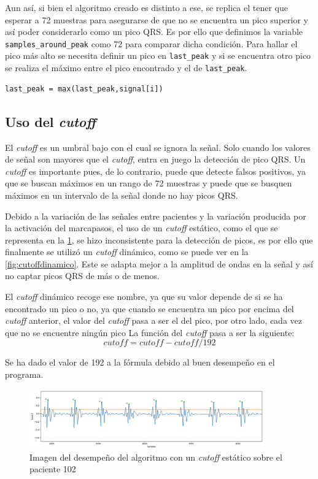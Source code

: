 Aun así, si bien el algoritmo creado es distinto a ese, se replica el tener que esperar a 72 muestras para asegurarse de que no se encuentra un pico superior y así poder considerarlo como un pico QRS. Es por ello que definimos la variable \texttt{samples\_around\_peak} como 72 para comparar dicha condición. Para hallar el pico más alto se necesita definir un pico en \texttt{last\_peak} y si se encuentra otro pico se realiza el máximo entre el pico encontrado y el de \texttt{last\_peak}.

\lstset{language=python, breaklines=true, basicstyle=\footnotesize}
\begin{lstlisting}[frame=single]
last_peak = max(last_peak,signal[i])
\end{lstlisting}
\subsection{Uso del \textit{cutoff}}
El \textit{cutoff} es un umbral bajo con el cual se ignora la señal. Solo cuando los valores de señal son mayores que el \textit{cutoff}, entra en juego la detección de pico QRS. Un \textit{cutoff} es importante pues, de lo contrario, puede que detecte falsos positivos, ya que se buscan máximos en un rango de 72 muestras y puede que se busquen máximos en un intervalo de la señal donde no hay picos QRS.

Debido a la variación de las señales entre pacientes y la variación producida por la activación del marcapasos, el uso de un \textit{cutoff} estático, como el que se representa en la \cref{fig:cutoffestatico}, se hizo inconsistente para la detección de picos, es por ello que finalmente se utilizó un \textit{cutoff} dinámico, como se puede ver en la \cref{fig:cutoffdinamico}. Este se adapta mejor a la amplitud de ondas en la señal y así no captar picos QRS de más o de menos.

El \textit{cutoff} dinámico recoge ese nombre, ya que su valor depende de si se ha encontrado un pico o no, ya que cuando se encuentra un pico por encima del \textit{cutoff} anterior, el valor del \textit{cutoff} pasa a ser el del pico, por otro lado, cada vez que no se encuentre ningún pico La función del \textit{cutoff} pasa a ser la siguiente:
\[cutoff = cutoff - cutoff/192\]

Se ha dado el valor de 192 a la fórmula debido al buen desempeño en el programa.

\begin{figure}[h!]
    \centering
    \includegraphics[width=0.9\textwidth]{./Images/img_algoritmo/cutoffestatico.png}
    \caption[Imagen de \textit{cutoff} estático]{Imagen del desempeño del algoritmo con un \textit{cutoff} estático sobre el paciente 102}
    \label{fig:cutoffestatico}
\end{figure}


